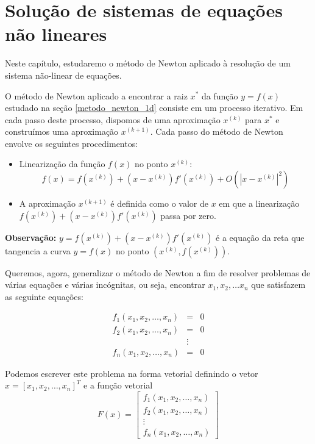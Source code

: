 
%

\chapter{Solução de sistemas de equações não lineares}
Neste capítulo, estudaremo o método de Newton aplicado à resolução de um sistema não-linear de equações.

O método de Newton aplicado a encontrar a raiz $x^*$ da função $y=f(x)$ estudado na seção \ref{metodo_newton_1d} consiste em um processo iterativo. Em cada passo deste processo, dispomos de uma aproximação $x^{(k)}$ para $x^*$ e construímos uma aproximação $x^{(k+1)}$.  Cada passo do método de Newton envolve os seguintes procedimentos:
\begin{itemize}
\item Linearização da função $f(x)$ no ponto $x^{(k)}$: 
  \begin{equation*}
f(x)= f(x^{(k)})+ (x-x^{(k)}) f'(x^{(k)}) + O\left(|x-x^{(k)}|^2\right)    
  \end{equation*}
\item A aproximação $x^{(k+1)}$ é definida como o valor de $x$ em que a linearização $f(x^{(k)})+ (x-x^{(k)}) f'(x^{(k)})$ passa por zero.
\end{itemize}

{\bf Observação:} $y=f(x^{(k)})+ (x-x^{(k)}) f'(x^{(k)})$ é a equação da reta que tangencia a curva $y=f(x)$ no ponto $(x^{(k)},f(x^{(k)}))$.


Queremos, agora, generalizar o método de Newton a fim de resolver problemas de várias equações e várias incógnitas, ou seja, encontrar $x_1,x_2,\ldots x_n$ que satisfazem as seguinte equações:

\begin{eqnarray*}
f_1(x_1,x_2,\ldots,x_n)&=&0\\
f_2(x_1,x_2,\ldots,x_n)&=&0\\
&\vdots&\\
f_n(x_1,x_2,\ldots,x_n)&=&0
\end{eqnarray*}

Podemos escrever este problema na forma vetorial definindo o vetor $x=[x_1,x_2,\ldots,x_n]^T$ e a função vetorial
$$F(x)=\left[
\begin{array}{c}
f_1(x_1,x_2,\ldots,x_n)\\
f_2(x_1,x_2,\ldots,x_n)\\
\vdots\\
f_n(x_1,x_2,\ldots,x_n)
\end{array}
\right]$$

